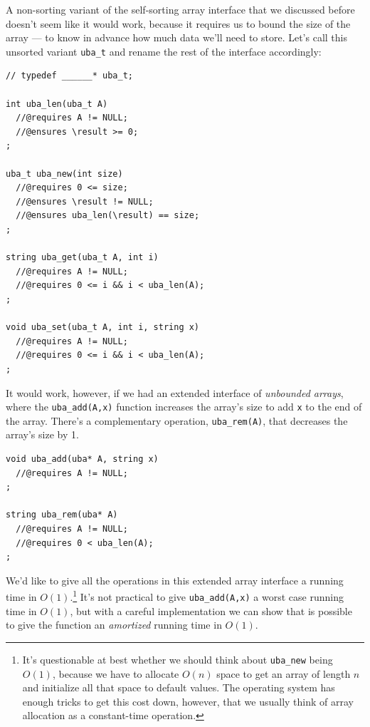 A non-sorting variant of the self-sorting array interface that we
discussed before doesn't seem like it would work, because it requires
us to bound the size of the array --- to know in advance how much data
we'll need to store.  Let's call this unsorted variant
\lstinline'uba_t' and rename the rest of the interface accordingly:
\begin{lstlisting}[language={[C0]C}]
// typedef ______* uba_t;

int uba_len(uba_t A)
  //@requires A != NULL;
  //@ensures \result >= 0;
;

uba_t uba_new(int size)
  //@requires 0 <= size;
  //@ensures \result != NULL;
  //@ensures uba_len(\result) == size;
;

string uba_get(uba_t A, int i)
  //@requires A != NULL;
  //@requires 0 <= i && i < uba_len(A);
;

void uba_set(uba_t A, int i, string x)
  //@requires A != NULL;
  //@requires 0 <= i && i < uba_len(A);
;
\end{lstlisting}
It would work, however, if we had an extended interface of
\emph{unbounded arrays}, where the \lstinline'uba_add(A,x)' function
increases the array's size to add \lstinline'x' to the end of the
array. There's a complementary operation, \lstinline'uba_rem(A)', that
decreases the array's size by 1.

\clearpage
\begin{lstlisting}[language={[C0]C}]
void uba_add(uba* A, string x)
  //@requires A != NULL;
;

string uba_rem(uba* A)
  //@requires A != NULL;
  //@requires 0 < uba_len(A);
;
\end{lstlisting}
We'd like to give all the operations in this extended array interface
a running time in $O(1)$.\footnote{It's questionable at best whether
  we should think about
  \lstinline[basicstyle=\smallerbasicstyle]'uba_new' being $O(1)$,
  because we have to allocate $O(n)$ space to get an array of length
  $n$ and initialize all that space to default values. The operating
  system has enough tricks to get this cost down, however, that we
  usually think of array allocation as a constant-time operation.}
It's not practical to give \lstinline'uba_add(A,x)' a worst case
running time in $O(1)$, but with a careful implementation we can show
that is possible to give the function an \emph{amortized} running time
in $O(1)$.





